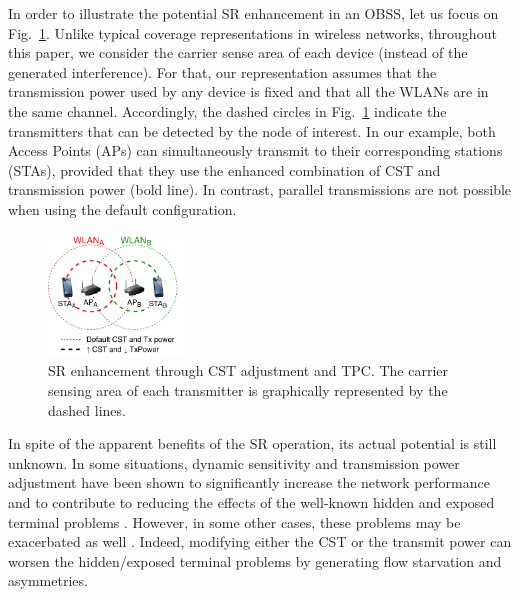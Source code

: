 \documentclass[comsoc]{IEEEtran}
\begin{document}
	In order to illustrate the potential SR enhancement in an OBSS, let us focus on Fig.~\ref{fig:spatial_reuse_11ax}. Unlike typical coverage representations in wireless networks, throughout this paper, we consider the carrier sense area of each device (instead of the generated interference). For that, our representation assumes that the transmission power used by any device is fixed and that all the WLANs are in the same channel. Accordingly, the dashed circles in Fig.~\ref{fig:spatial_reuse_11ax} indicate the transmitters that can be detected by the node of interest. In our example, both Access Points (APs) can simultaneously transmit to their corresponding stations (STAs), provided that they use the enhanced combination of CST and transmission power (bold line). In contrast, parallel transmissions are not possible when using the default configuration.
	\begin{figure}[ht!]
		\centering
		\includegraphics[width=0.33\textwidth]{fig_1.pdf}
		\caption{SR enhancement through CST adjustment and TPC. The carrier sensing area of each transmitter is graphically represented by the dashed lines.}
		\label{fig:spatial_reuse_11ax}
	\end{figure}
	
	In spite of the apparent benefits of the SR operation, its actual potential is still unknown. In some situations, dynamic sensitivity and transmission power adjustment have been shown to significantly increase the network performance and to contribute to reducing the effects of the well-known hidden and exposed terminal problems \cite{zhou2005balancing}. However, in some other cases, these problems may be exacerbated as well \cite{wilhelmi2019potential}. Indeed, modifying either the CST or the transmit power can worsen the hidden/exposed terminal problems by generating flow starvation and asymmetries.
	
\end{document}
